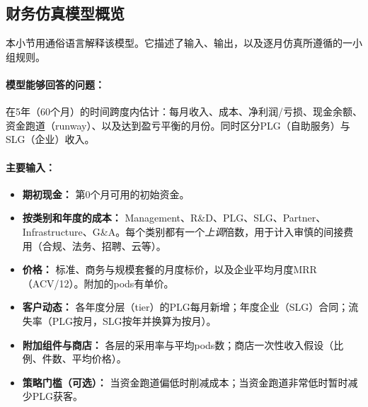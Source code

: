 \documentclass[11pt, a4paper, oneside]{article}
\begin{document}
\subsection{财务仿真模型概览}
\label{subsec:simple-model}

本小节用通俗语言解释该模型。它描述了输入、输出，以及逐月仿真所遵循的一小组规则。

\paragraph{模型能够回答的问题：}
在5年（60个月）的时间跨度内估计：每月收入、成本、净利润/亏损、现金余额、资金跑道（runway）、以及达到盈亏平衡的月份。同时区分PLG（自助服务）与SLG（企业）收入。

\paragraph{主要输入：}
\begin{itemize}
\item \textbf{期初现金：} 第0个月可用的初始资金。
\item \textbf{按类别和年度的成本：} Management、R\&D、PLG、SLG、Partner、Infrastructure、G\&A。每个类别都有一个\emph{上调}倍数，用于计入审慎的间接费用（合规、法务、招聘、云等）。
\item \textbf{价格：} 标准、商务与规模套餐的月度标价，以及企业平均月度MRR（ACV/12）。附加的pods有单价。
\item \textbf{客户动态：} 各年度分层（tier）的PLG每月新增；年度企业（SLG）合同；流失率（PLG按月，SLG按年并换算为按月）。
\item \textbf{附加组件与商店：} 各层的采用率与平均pods数；商店一次性收入假设（比例、件数、平均价格）。
\item \textbf{策略门槛（可选）：} 当资金跑道偏低时削减成本；当资金跑道非常低时暂时减少PLG获客。
\end{itemize}
\end{document}
